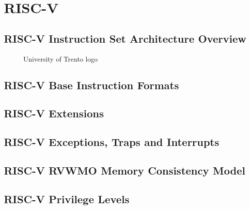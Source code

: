 \chapter{RISC-V}
\label{cha:riscv}

\lipsum[1]

\section{RISC-V Instruction Set Architecture Overview}
\label{sec:riscv_isa}

\lipsum[1]

\begin{figure}[htbp]
  \centering
  \def\stackalignment{r} %
  {\scriptsize }
  \caption{University of Trento logo}
  \label{fig:csr}
\end{figure}

\section{RISC-V Base Instruction Formats}
\label{sec:riscv_bif}

\lipsum[1]

\section{RISC-V Extensions}
\label{sec:riscv_extensions}

\lipsum[1]

\section{RISC-V Exceptions, Traps and Interrupts}
\label{sec:riscv_eti}

\lipsum[1]

\section{RISC-V RVWMO Memory Consistency Model}
\label{sec:riscv_rvwmo}

\lipsum[1]

\section{RISC-V Privilege Levels}
\label{sec:riscv_privileges}


